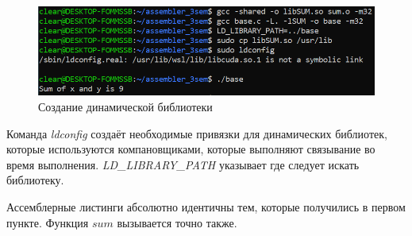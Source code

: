 \documentclass[a4paper,12pt]{article}
\begin{document}
\begin{figure}[H]\label{fig: dynLibCreation}
    \centering
    \includegraphics[width = 0.8 \textwidth]{Создание дин библиотеки.png}
    \caption{Создание динамической библиотеки}
\end{figure}

Команда \textit{ldconfig} создаёт необходимые привязки для динамических библиотек, которые используются компановщиками, которые выполняют связывание во время выполнения. \textit{LD\_LIBRARY\_PATH} указывает где следует искать библиотеку.    

Ассемблерные листинги абсолютно идентичны тем, которые получились в первом пункте. Функция $sum$ вызывается точно также.
\end{document}
